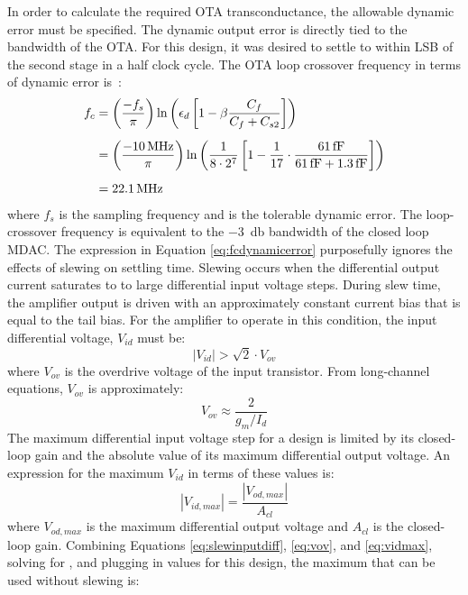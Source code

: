 In order to calculate the required OTA transconductance, the allowable dynamic error must be specified. The dynamic output error is directly tied to the bandwidth of the OTA. For this design, it was desired to settle to within  LSB of the second stage in a half clock cycle. The OTA loop crossover frequency in terms of dynamic error is~\cite{315areader}:
\begin{align}
\label{eq:fcdynamicerror}
f_{c} &= \left(\dfrac{-f_{s}}{\pi}\right)\ln\left(\epsilon_{d}\left[1-\beta\dfrac{C_{f}}{C_{f}+C_{s2}}\right]\right) \\[0.5em]
\nonu &= \left(\dfrac{-\SI{10}{\mega\hertz}}{\pi}\right)\ln\left(\dfrac{1}{8\cdot2^{7}}\left[1-\dfrac{1}{17}\cdot\dfrac{\SI{61}{\femto\farad}}{\SI{61}{\femto\farad}+\SI{1.3}{\femto\farad}}\right]\right) \\[0.5em]
\nonu &= \SI{22.1}{\mega\hertz}
\end{align}
where $f_{s}$ is the sampling frequency and \ed\spc is the tolerable dynamic error. The loop-crossover frequency is equivalent to the \SI{-3}{\decibel} bandwidth of the closed loop MDAC. The expression in Equation \ref{eq:fcdynamicerror} purposefully ignores the effects of slewing on settling time. Slewing occurs when the differential output current saturates to to large differential input voltage steps. During slew time, the amplifier output is driven with an approximately constant current bias that is equal to the tail bias. For the amplifier to operate in this condition, the input differential voltage, $V_{id}$ must be:
\begin{equation}
\label{eq:slewinputdiff}
|V_{id}| > \sqrt{2}\cdot V_{ov}
\end{equation}
where $V_{ov}$ is the overdrive voltage of the input transistor. From long-channel equations, $V_{ov}$ is approximately:
\begin{equation}
\label{eq:vov}
V_{ov} \approx \dfrac{2}{g_{m}/I_{d}}
\end{equation}
The maximum differential input voltage step for a design is limited by its closed-loop gain and the absolute value of its maximum differential output voltage. An expression for the maximum $V_{id}$ in terms of these values is:
\begin{equation}
\label{eq:vidmax}
|V_{id,max}| = \dfrac{|V_{od,max}|}{A_{cl}} 
\end{equation}
where $V_{od,max}$ is the maximum differential output voltage and $A_{cl}$ is the closed-loop gain. Combining Equations \ref{eq:slewinputdiff}, \ref{eq:vov}, and \ref{eq:vidmax}, solving for \gmid, and plugging in values for this design, the maximum \gmid\spc that can be used without slewing is:
